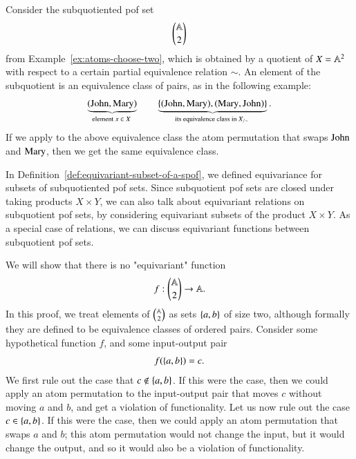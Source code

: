 \begin{myexample}
    Consider the subquotiented pof set
\begin{align*}
\mathbb A \choose 2
\end{align*}
from Example~\ref{ex:atoms-choose-two}, which is obtained by a quotient of $X = \mathbb A^2$ with respect to a certain partial equivalence relation $\sim$.  An element  of the subquotient is  an equivalence class of  pairs, as in the following example: 
\begin{align}\label{eq:subquotiented-element-example}
   \myunderbrace{(\john,\mary)}{element $x \in X$} 
   \qquad 
   \myunderbrace{\set{(\john,\mary),(\mary,\john)}}{its equivalence class in $X_{/\sim}$}.
\end{align}
If we apply to the above equivalence class the atom permutation that swaps $\text{John}$ and $\text{Mary}$, then we get the same equivalence class. 
\end{myexample}

In Definition~\ref{def:equivariant-subset-of-a-spof}, we defined equivariance for subsets of subquotiented pof sets. Since subquotient pof sets are closed under taking products $X \times Y$, we can also talk about equivariant relations on subquotient pof sets, by considering equivariant subsets of the product $X \times Y$. As a special case of relations, we can discuss equivariant functions between subquotient pof sets.

\begin{myexample}\label{ex:choice-spof}
    We will show that there is no "equivariant" function 
    \begin{align*}
    f : {\mathbb A \choose 2} \to \mathbb A.
    \end{align*}
    In this proof, we treat elements of $\mathbb A \choose 2$ as sets $\{a,b\}$ of size two, although formally they are defined to be equivalence classes of ordered pairs.  Consider some hypothetical function $f$, and some  input-output pair 
    \begin{align*}
        f(\{a,b\})=c.
    \end{align*}
    We first rule out the case that $c \not \in \{a,b\}$. If this were the case, then  we could apply an  atom permutation to the input-output pair that moves $c$ without moving $a$ and $b$, and get a violation of functionality. Let us now rule out the case $c \in \{a,b\}$. If this were the case, then we could apply an atom permutation that swaps $a$ and $b$; this atom permutation would not change the input, but it would change the output, and so it would also be a violation of functionality. 
\end{myexample}




